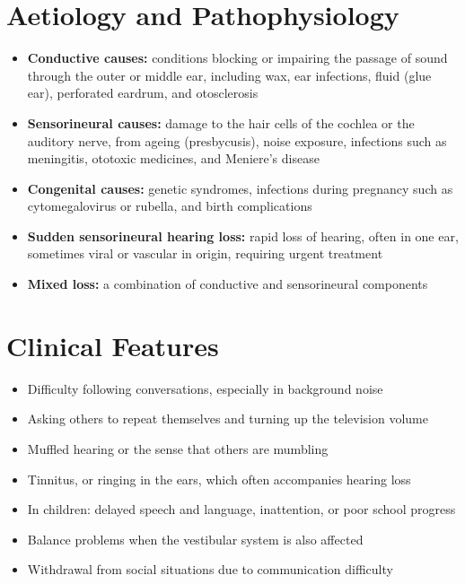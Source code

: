 \section*{Aetiology and Pathophysiology}
\begin{itemize}
    \item \textbf{Conductive causes:} conditions blocking or impairing the passage of sound through the outer or middle ear, including wax, ear infections, fluid (glue ear), perforated eardrum, and otosclerosis
    \item \textbf{Sensorineural causes:} damage to the hair cells of the cochlea or the auditory nerve, from ageing (presbycusis), noise exposure, infections such as meningitis, ototoxic medicines, and Meniere's disease
    \item \textbf{Congenital causes:} genetic syndromes, infections during pregnancy such as cytomegalovirus or rubella, and birth complications
    \item \textbf{Sudden sensorineural hearing loss:} rapid loss of hearing, often in one ear, sometimes viral or vascular in origin, requiring urgent treatment
    \item \textbf{Mixed loss:} a combination of conductive and sensorineural components
\end{itemize}

\section*{Clinical Features}
\begin{itemize}
    \item Difficulty following conversations, especially in background noise
    \item Asking others to repeat themselves and turning up the television volume
    \item Muffled hearing or the sense that others are mumbling
    \item Tinnitus, or ringing in the ears, which often accompanies hearing loss
    \item In children: delayed speech and language, inattention, or poor school progress
    \item Balance problems when the vestibular system is also affected
    \item Withdrawal from social situations due to communication difficulty
\end{itemize}

